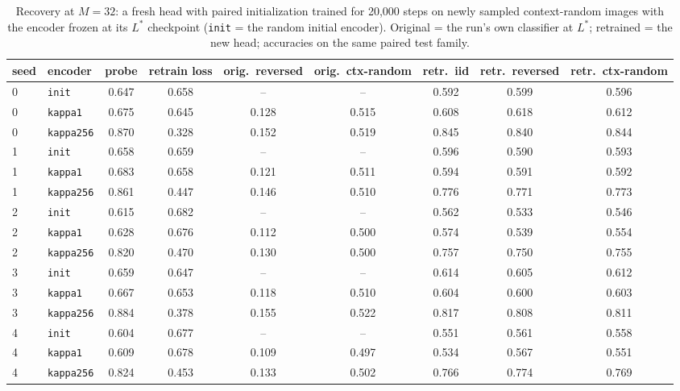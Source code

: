\begin{table}[htbp]\centering\scriptsize
\caption{Recovery at $M=32$: a fresh head with paired initialization trained for 20,000 steps on newly sampled context-random images with the encoder frozen at its $L^\ast$ checkpoint (\texttt{init} = the random initial encoder). Original = the run's own classifier at $L^\ast$; retrained = the new head; accuracies on the same paired test family.}\label{tab:exp2_recovery}
\begin{tabular}{llccccccc}\toprule seed & encoder & probe & retrain loss & orig.\ reversed & orig.\ ctx-random & retr.\ iid & retr.\ reversed & retr.\ ctx-random \\ \midrule
0 & \texttt{init} & 0.647 & 0.658 & -- & -- & 0.592 & 0.599 & 0.596 \\
0 & \texttt{kappa1} & 0.675 & 0.645 & 0.128 & 0.515 & 0.608 & 0.618 & 0.612 \\
0 & \texttt{kappa256} & 0.870 & 0.328 & 0.152 & 0.519 & 0.845 & 0.840 & 0.844 \\
1 & \texttt{init} & 0.658 & 0.659 & -- & -- & 0.596 & 0.590 & 0.593 \\
1 & \texttt{kappa1} & 0.683 & 0.658 & 0.121 & 0.511 & 0.594 & 0.591 & 0.592 \\
1 & \texttt{kappa256} & 0.861 & 0.447 & 0.146 & 0.510 & 0.776 & 0.771 & 0.773 \\
2 & \texttt{init} & 0.615 & 0.682 & -- & -- & 0.562 & 0.533 & 0.546 \\
2 & \texttt{kappa1} & 0.628 & 0.676 & 0.112 & 0.500 & 0.574 & 0.539 & 0.554 \\
2 & \texttt{kappa256} & 0.820 & 0.470 & 0.130 & 0.500 & 0.757 & 0.750 & 0.755 \\
3 & \texttt{init} & 0.659 & 0.647 & -- & -- & 0.614 & 0.605 & 0.612 \\
3 & \texttt{kappa1} & 0.667 & 0.653 & 0.118 & 0.510 & 0.604 & 0.600 & 0.603 \\
3 & \texttt{kappa256} & 0.884 & 0.378 & 0.155 & 0.522 & 0.817 & 0.808 & 0.811 \\
4 & \texttt{init} & 0.604 & 0.677 & -- & -- & 0.551 & 0.561 & 0.558 \\
4 & \texttt{kappa1} & 0.609 & 0.678 & 0.109 & 0.497 & 0.534 & 0.567 & 0.551 \\
4 & \texttt{kappa256} & 0.824 & 0.453 & 0.133 & 0.502 & 0.766 & 0.774 & 0.769 \\
\bottomrule\end{tabular}\end{table}
